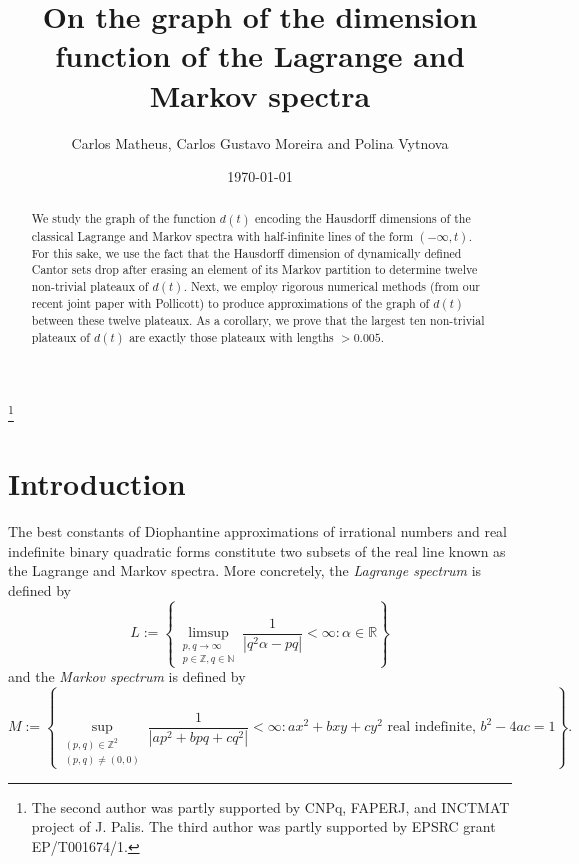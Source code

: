 \documentclass[10pt]{amsart}
\numberwithin{equation}{section}
\theoremstyle{definition}
\begin{document}
\title[The graph of the dimension function of the classical spectra]{On the graph of the dimension function of the Lagrange and Markov spectra} 

\author[C. Matheus, C. G. Moreira and P. Vytnova]{Carlos Matheus,
Carlos Gustavo Moreira and Polina Vytnova} 

\address{C. Matheus, CNRS \& \'Ecole Polytechnique, CNRS (UMR 7640), 91128, Palaiseau, France.}

\address{C. G. Moreira, School of Mathematical Sciences, Nankai University, Tianjin 300071, P. R.China, and IMPA, Estrada Dona Castorina 110, CEP 22460-320, Rio de Janeiro, Brazil.}

 \address{P. Vytnova, Department of Mathematics, University of Surrey,
 Guildford, GU2 7XH, UK.}


\thanks{The second author was partly supported by CNPq, FAPERJ, and INCTMAT project of J. Palis. The third author was partly supported by EPSRC grant EP/T001674/1. }


\date{\today}

\begin{abstract}
    We study the graph of the function $d(t)$ encoding the Hausdorff dimensions
    of the classical Lagrange and Markov spectra with half-infinite lines of the
    form $(-\infty, t)$. For this sake, we use the fact that the Hausdorff
    dimension of dynamically defined Cantor sets drop after erasing an element of its
    Markov partition to determine twelve non-trivial plateaux of $d(t)$. Next,
    we employ rigorous numerical methods (from our recent joint paper with
    Pollicott) to produce approximations of the graph of $d(t)$ between these
    twelve plateaux. As a corollary, we prove that the largest ten non-trivial
    plateaux of $d(t)$ are exactly those plateaux with lengths $>0.005$. 
\end{abstract}\maketitle


\section{Introduction}
\label{s:intro}
The best constants of Diophantine approximations of irrational numbers and real
indefinite binary quadratic forms constitute two subsets of the real line known
as the Lagrange and Markov spectra. More concretely, the \emph{Lagrange
spectrum} is defined by
$$L:=\left\{\limsup\limits_{\substack{p,q\to\infty \\ p\in\mathbb{Z},
q\in\mathbb{N}}}\frac{1}{|q^2\alpha-pq|}<\infty: \alpha\in\mathbb{R}\right\}$$ 
and the \emph{Markov spectrum} is defined by
$$M:=\left\{\sup\limits_{\substack{(p,q)\in\mathbb{Z}^2 \\
(p,q)\neq(0,0)}}\frac{1}{|ap^2+bpq+cq^2|}<\infty: ax^2+bxy+cy^2 \textrm{ real
indefinite, }b^2-4ac=1\right\}.$$  
\end{document}
